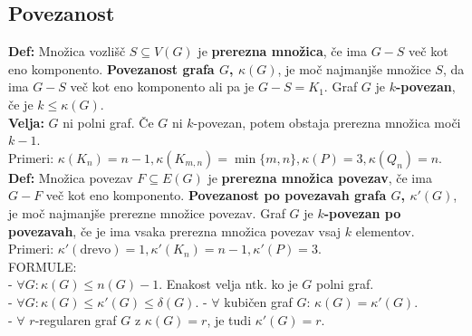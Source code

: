 \documentclass[a4paper,10pt]{article}
\theoremstyle{definition}
\let\oldtextbf\textbf
\renewcommand{\textbf}[1]{\oldtextbf{\boldmath #1}}
\begin{document}
\subsection*{Povezanost}
\textbf{Def:} Množica vozlišč $S \subseteq V(G)$ je \textbf{prerezna množica}, če ima $G - S$ več kot eno komponento. \textbf{Povezanost grafa $G$, $\kappa(G)$}, je moč najmanjše množice $S$, da ima $G-S$ več kot eno komponento ali pa je $G - S = K_1$. Graf $G$ je \textbf{$k$-povezan}, če je $k \leq \kappa(G)$.\\
\textbf{Velja:} $G$ ni polni graf. Če $G$ ni $k$-povezan, potem obstaja prerezna množica moči $k-1$.\\
Primeri: $\kappa(K_n) = n-1, \kappa(K_{m,n}) = \min\{m, n\}, \kappa(P) = 3, \kappa(Q_n) = n$.\\
\textbf{Def:} Množica povezav $F \subseteq E(G)$ je \textbf{prerezna množica povezav}, če ima $G - F$ več kot eno komponento. \textbf{Povezanost po povezavah grafa $G$, $\kappa'(G)$}, je moč najmanjše prerezne množice povezav. Graf $G$ je \textbf{$k$-povezan po povezavah}, če je ima vsaka prerezna množica povezav vsaj $k$ elementov.\\
Primeri: $\kappa'(\text{drevo}) = 1, \kappa'(K_n) = n-1, \kappa'(P) = 3$.\\
FORMULE:\\
- $\forall G\colon \kappa(G) \leq n(G) - 1$. Enakost velja ntk. ko je $G$ polni graf.\\
- $\forall G\colon \kappa(G) \leq \kappa'(G) \leq \delta(G)$.
- $\forall$ kubičen graf $G$: $\kappa(G) = \kappa'(G)$.\\
- $\forall$ $r$-regularen graf $G$ z $\kappa(G) = r$, je tudi $\kappa'(G) = r$.
\end{document}

